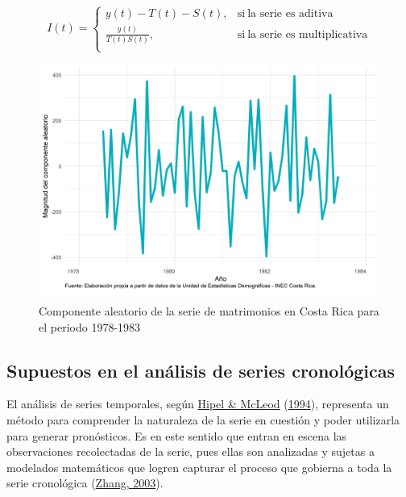 \documentclass[
]{article}
\begin{document}
\begin{equation}
\label{eqn:descomposicion_irregular}
I(t)=
\begin{cases}
y(t)-T(t)-S(t), & \text{si}\ \text{la serie es aditiva} \\
\frac{y(t)}{T(t)S(t)} , & \text{si}\ \text{la serie es multiplicativa} \\
\end{cases}
\end{equation}

\begin{figure}[H]
\includegraphics[width=1\linewidth,height=1\textheight]{Tesis_files/figure-latex/ejemplo_aleatorio-1} \caption{Componente aleatorio de la serie de matrimonios en Costa Rica para el periodo 1978-1983}\label{fig:ejemplo_aleatorio}
\end{figure}

\subsection{Supuestos en el análisis de series cronológicas}

El análisis de series temporales, según
\protect\hyperlink{ref-Hipel}{Hipel \& McLeod}
(\protect\hyperlink{ref-Hipel}{1994}), representa un método para
comprender la naturaleza de la serie en cuestión y poder utilizarla para
generar pronósticos. Es en este sentido que entran en escena las
observaciones recolectadas de la serie, pues ellas son analizadas y
sujetas a modelados matemáticos que logren capturar el proceso que
gobierna a toda la serie cronológica
(\protect\hyperlink{ref-Zhang}{Zhang, 2003}).
\end{document}

